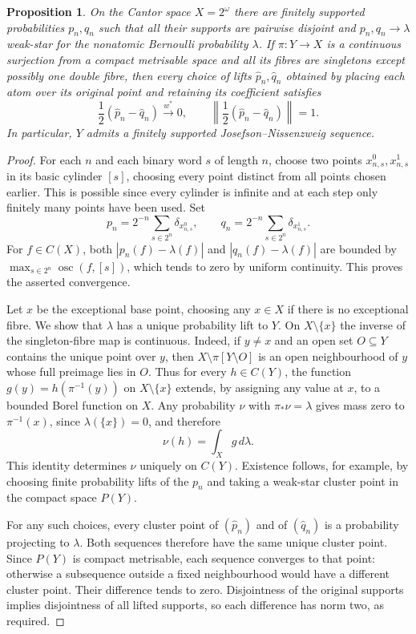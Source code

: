 \documentclass[a4paper,11pt]{amsart}
\theoremstyle{plain}
\newtheorem{proposition}[theorem]{Proposition}
\theoremstyle{definition}
\theoremstyle{remark}
\numberwithin{equation}{section}
\begin{document}
\begin{proposition}\label{prop:one-point}
On the Cantor space $X=2^\omega$ there are finitely supported probabilities $p_n,q_n$ such that all their supports are pairwise disjoint and $p_n,q_n\to\lambda$ weak-star for the nonatomic Bernoulli probability $\lambda$. If $\pi:Y\to X$ is a continuous surjection from a compact metrisable space and all its fibres are singletons except possibly one double fibre, then every choice of lifts $\widehat p_n,\widehat q_n$ obtained by placing each atom over its original point and retaining its coefficient satisfies
\[
\frac12(\widehat p_n-\widehat q_n)\xrightarrow{w^*}0,
\qquad
\left\|\frac12(\widehat p_n-\widehat q_n)\right\|=1.
\]
In particular, $Y$ admits a finitely supported Josefson--Nissenzweig sequence.
\end{proposition}
\begin{proof}
For each $n$ and each binary word $s$ of length $n$, choose two points $x^0_{n,s},x^1_{n,s}$ in its basic cylinder $[s]$, choosing every point distinct from all points chosen earlier. This is possible since every cylinder is infinite and at each step only finitely many points have been used. Set
\[
p_n=2^{-n}\sum_{s\in2^n}\delta_{x^0_{n,s}},\qquad
q_n=2^{-n}\sum_{s\in2^n}\delta_{x^1_{n,s}}.
\]
For $f\in C(X)$, both $|p_n(f)-\lambda(f)|$ and $|q_n(f)-\lambda(f)|$ are bounded by $\max_{s\in2^n}\operatorname{osc}(f,[s])$, which tends to zero by uniform continuity. This proves the asserted convergence.

Let $x$ be the exceptional base point, choosing any $x\in X$ if there is no exceptional fibre. We show that $\lambda$ has a unique probability lift to $Y$. On $X\setminus\{x\}$ the inverse of the singleton-fibre map is continuous. Indeed, if $y\neq x$ and an open set $O\subseteq Y$ contains the unique point over $y$, then $X\setminus\pi[Y\setminus O]$ is an open neighbourhood of $y$ whose full preimage lies in $O$. Thus for every $h\in C(Y)$, the function $g(y)=h(\pi^{-1}(y))$ on $X\setminus\{x\}$ extends, by assigning any value at $x$, to a bounded Borel function on $X$. Any probability $\nu$ with $\pi_*\nu=\lambda$ gives mass zero to $\pi^{-1}(x)$, since $\lambda(\{x\})=0$, and therefore
\[
\nu(h)=\int_X g\,d\lambda.
\]
This identity determines $\nu$ uniquely on $C(Y)$. Existence follows, for example, by choosing finite probability lifts of the $p_n$ and taking a weak-star cluster point in the compact space $P(Y)$.

For any such choices, every cluster point of $(\widehat p_n)$ and of $(\widehat q_n)$ is a probability projecting to $\lambda$. Both sequences therefore have the same unique cluster point. Since $P(Y)$ is compact metrisable, each sequence converges to that point: otherwise a subsequence outside a fixed neighbourhood would have a different cluster point. Their difference tends to zero. Disjointness of the original supports implies disjointness of all lifted supports, so each difference has norm two, as required.
\end{proof}
\end{document}
